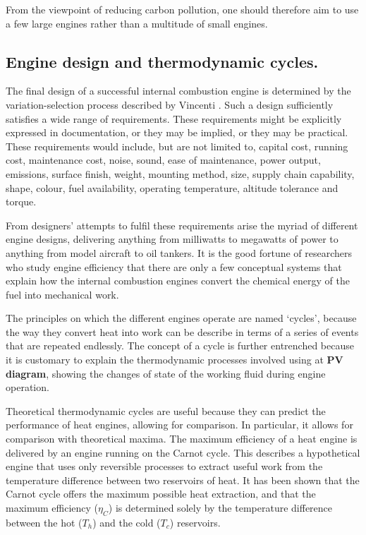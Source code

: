 From the viewpoint of reducing carbon pollution, one should therefore aim to use
a few large engines rather than a multitude of small engines.

\subsection{Engine design and thermodynamic cycles.} \label{par:efficiency}

The final design of a successful internal combustion engine is determined by the
variation-selection process described by Vincenti \autocite{Vincenti1990}. Such
a design sufficiently satisfies a wide range of requirements. These requirements
might be explicitly expressed in documentation, or they may be implied, or they
may be practical. These requirements would include, but are not limited to,
capital cost, running cost, maintenance cost, noise, sound, ease of maintenance, power
output, emissions, surface finish, weight, mounting method, size, supply chain
capability, shape, colour, fuel availability, operating temperature, altitude
tolerance and torque.

From designers' attempts to fulfil these requirements arise the myriad of
different engine designs, delivering anything from milliwatts to megawatts of
power to anything from model aircraft to oil tankers. It is the good fortune of
researchers who study engine efficiency that there are only a few conceptual
systems that explain how the internal combustion engines convert the chemical
energy of the fuel into mechanical work.

The principles on which the different engines operate are named `cycles',
because the way they convert heat into work can be describe in terms of a series
of events that are repeated endlessly. The concept of a cycle is
further entrenched because it is customary to explain the thermodynamic
processes involved using at \textbf{PV diagram}, showing the changes of state of
the working fluid during engine operation.

Theoretical thermodynamic cycles are useful because they can predict the
performance of heat engines, allowing for comparison. In particular, it allows
for comparison with theoretical maxima. The maximum efficiency of a heat engine
is delivered by an engine running on the Carnot cycle. This describes a
hypothetical engine that uses only reversible processes to extract useful work
from the temperature difference between two reservoirs of heat. It has been
shown that the Carnot cycle offers the maximum possible heat extraction, and
that the maximum efficiency (\(\eta_{C}\)) is determined solely by the temperature
difference between the hot (\(T_h\)) and the cold (\(T_c\)) reservoirs.

